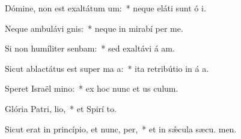 \item Dómine, non est exaltátum  um:~* neque eláti sunt ó i.
\item Neque ambulávi  gnis:~* neque in mirabí per me.
\item Si non humíliter senbam:~* sed exaltávi á am.
\item Sicut ablactátus est super ma a:~* ita retribútio in á a.
\item Speret Israël  mino:~* ex hoc nunc et us  culum.
\item Glória Patri,  lio,~* et Spirí to.
\item Sicut erat in princípio, et nunc,  per,~* et in sǽcula sæcu. men.
